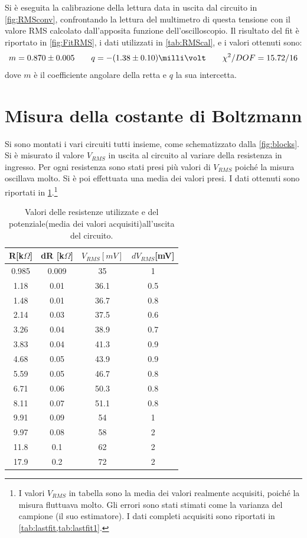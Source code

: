\documentclass[a4paper,10pt]{article}
\begin{document}
Si è eseguita la calibrazione della lettura data in uscita dal circuito in \cref{fig:RMSconv}, confrontando la lettura del multimetro di questa tensione con il valore RMS calcolato dall'apposita funzione dell'oscilloscopio.
Il risultato del fit è riportato in \cref{fig:FitRMS}, i dati utilizzati in \cref{tab:RMScal}, e i valori ottenuti sono:
\[ m = 0.870 \pm 0.005	\qquad	q = -(1.38\pm0.10) \milli\volt	\qquad	\chi^2/DOF = 15.72 / 16 \]
dove $ m $ è il coefficiente angolare della retta e $ q $ la sua intercetta.


\section{Misura della costante di Boltzmann}
\vspace*{-5pt}
Si sono montati i vari circuiti tutti insieme, come schematizzato dalla \cref{fig:blocks}. Si è misurato il valore $V_{RMS}$ in uscita al circuito al variare della resistenza in ingresso. Per ogni resistenza sono stati presi più valori di $V_{RMS}$ poiché la misura oscillava molto. Si è poi effettuata una media dei valori presi. I dati ottenuti sono riportati in \cref{tab:lastfitav}.\footnote{I valori $V_{RMS}$ in tabella sono la media dei valori realmente acquisiti, poiché la misura fluttuava molto. Gli errori sono stati stimati come la varianza del campione (il suo estimatore). I dati completi acquisiti sono riportati in \cref{tab:lastfit,tab:lastfit1}.}
\vspace*{-10pt}
\begin{table}[H]
	\centering
	\begin{tabular}{cccc}
		\hline
		R[k$\Omega$] & dR [k$\Omega$] & $V_{RMS}[mV]$  & $dV_{RMS}$[mV] \\
		\hline
		0.985 & 0.009 & 35 & 1 \\
		1.18 & 0.01 & 36.1 & 0.5 \\
		1.48 & 0.01 & 36.7 & 0.8 \\
		2.14 & 0.03 & 37.5 & 0.6 \\
		3.26 & 0.04 & 38.9 & 0.7 \\
		3.83 & 0.04 & 41.3 & 0.9 \\
		4.68 & 0.05 & 43.9 & 0.9 \\
		5.59 & 0.05 & 46.7 & 0.8 \\
		6.71 & 0.06 & 50.3 & 0.8 \\
		8.11 & 0.07 & 51.1 & 0.8 \\
		9.91 & 0.09 & 54 & 1 \\
		9.97 & 0.08 & 58 & 2 \\
		11.8 & 0.1 & 62 & 2 \\
		17.9 & 0.2 & 72 & 2 \\
		\hline
	\end{tabular}
	\vspace*{-5pt}
	\caption{Valori delle resistenze utilizzate e del potenziale(media dei valori acquisiti)all'uscita del circuito.}
	\label{tab:lastfitav}
\end{table}
\end{document}
